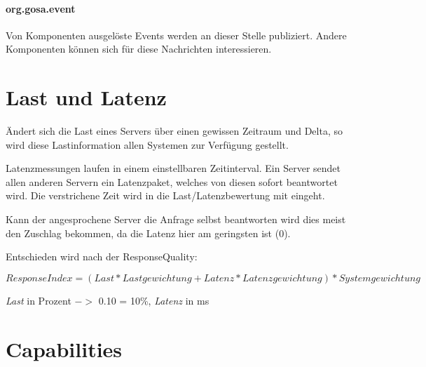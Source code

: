 \paragraph{org.gosa.event}

Von Komponenten ausgelöste Events werden an dieser Stelle publiziert. Andere Komponenten
können sich für diese Nachrichten interessieren.

%
%


%
%
%
%
%
%
%
%
%

\section{Last und Latenz}

Ändert sich die Last eines Servers über einen gewissen Zeitraum und Delta, so wird diese
Lastinformation allen Systemen zur Verfügung gestellt.

Latenzmessungen laufen in einem einstellbaren Zeitinterval. Ein Server sendet allen anderen
Servern ein Latenzpaket, welches von diesen sofort beantwortet wird. Die verstrichene Zeit
wird in die Last/Latenzbewertung mit eingeht.

Kann der angesprochene Server die Anfrage selbst beantworten wird dies meist den
Zuschlag bekommen, da die Latenz hier am geringsten ist (0).

Entschieden wird nach der ResponseQuality:

$$ResponseIndex = ( Last * Lastgewichtung + Latenz * Latenzgewichtung ) * Systemgewichtung$$

{\it Last} in Prozent $->$ 0.10 = 10\%, {\it Latenz} in ms


\section{Capabilities}

